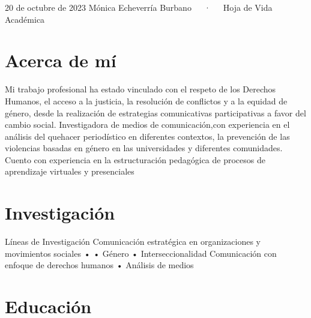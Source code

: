 \documentclass[11pt,a4paper,]{awesome-cv}
\begin{document}
\makecvheader

\makecvfooter
  {20 de octubre de 2023}
    {Mónica Echeverría Burbano~~~·~~~Hoja de Vida Académica}
  {\thepage}





\hypertarget{acerca-de-muxed}{%
\section{Acerca de mí}\label{acerca-de-muxed}}

Mi trabajo profesional ha estado vinculado con el respeto de los
Derechos Humanos, el acceso a la justicia, la resolución de conflictos y
a la equidad de género, desde la realización de estrategias
comunicativas participativas a favor del cambio social. Investigadora de
medios de comunicación,con experiencia en el análisis del quehacer
periodístico en diferentes contextos, la prevención de las violencias
basadas en género en las universidades y diferentes comunidades. Cuento
con experiencia en la estructuración pedagógica de procesos de
aprendizaje virtuales y presenciales

\hypertarget{investigaciuxf3n}{%
\section{Investigación}\label{investigaciuxf3n}}

\begin{cvskills}
  \cvskill
    {Líneas de Investigación}
    {Comunicación estratégica en organizaciones y movimientos sociales •  • Género • Interseccionalidad \newline
    Comunicación con enfoque de derechos humanos • Análisis de medios}
\end{cvskills}

\hypertarget{educaciuxf3n}{%
\section{Educación}\label{educaciuxf3n}}
\end{document}
